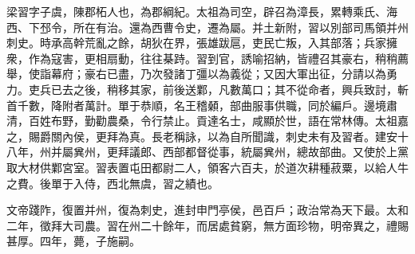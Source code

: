 \begin{pinyinscope}
 
 
 梁習字子虞，陳郡柘人也，為郡綱紀。太祖為司空，辟召為漳長，累轉乘氏、海西、下邳令，所在有治。還為西曹令史，遷為屬。并土新附，習以別部司馬領并州刺史。時承高幹荒亂之餘，胡狄在界，張雄跋扈，吏民亡叛，入其部落；兵家擁衆，作為寇害，更相扇動，往往棊跱。習到官，誘喻招納，皆禮召其豪右，稍稍薦舉，使詣幕府；豪右已盡，乃次發諸丁彊以為義從；又因大軍出征，分請以為勇力。吏兵已去之後，稍移其家，前後送鄴，凡數萬口；其不從命者，興兵致討，斬首千數，降附者萬計。單于恭順，名王稽顙，部曲服事供職，同於編戶。邊境肅清，百姓布野，勤勸農桑，令行禁止。貢達名士，咸顯於世，語在常林傳。太祖嘉之，賜爵關內侯，更拜為真。長老稱詠，以為自所聞識，刺史未有及習者。建安十八年，州并屬兾州，更拜議郎、西部都督從事，統屬兾州，總故部曲。又使於上黨取大材供鄴宮室。習表置屯田都尉二人，領客六百夫，於道次耕種菽粟，以給人牛之費。後單于入侍，西北無虞，習之績也。
 
 
 文帝踐阼，復置并州，復為刺史，進封申門亭侯，邑百戶；政治常為天下最。太和二年，徵拜大司農。習在州二十餘年，而居處貧窮，無方面珍物，明帝異之，禮賜甚厚。四年，薨，子施嗣。
 

\end{pinyinscope}
